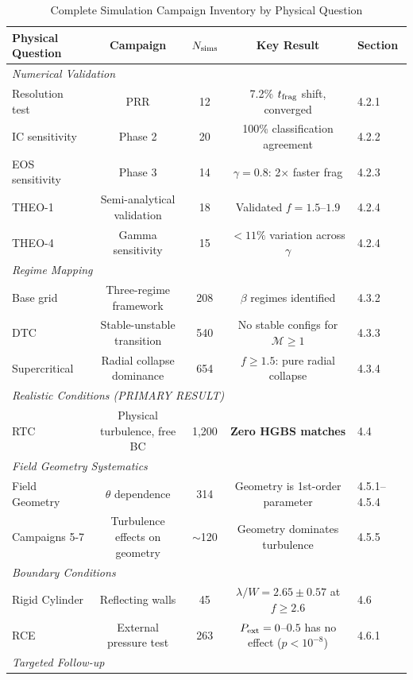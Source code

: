\documentclass[twocolumn,usenatbib]{mnras}
\begin{document}
\begin{table}
\caption{Complete Simulation Campaign Inventory by Physical Question}
\label{tab:campaign_master}
\small
\begin{tabular}{lcccl}
\toprule
\textbf{Physical Question} & \textbf{Campaign} & $N_{\rm sims}$ & \textbf{Key Result} & \textbf{Section} \\
\midrule
\multicolumn{5}{l}{\textit{Numerical Validation}} \\
Resolution test & PRR & 12 & 7.2\% $t_{\rm frag}$ shift, converged & 4.2.1 \\
IC sensitivity & Phase 2 & 20 & 100\% classification agreement & 4.2.2 \\
EOS sensitivity & Phase 3 & 14 & $\gamma=0.8$: 2$\times$ faster frag & 4.2.3 \\
THEO-1 & Semi-analytical validation & 18 & Validated $f=1.5$--$1.9$ & 4.2.4 \\
THEO-4 & Gamma sensitivity & 15 & $<11\%$ variation across $\gamma$ & 4.2.4 \\
\midrule
\multicolumn{5}{l}{\textit{Regime Mapping}} \\
Base grid & Three-regime framework & 208 & $\beta$ regimes identified & 4.3.2 \\
DTC & Stable-unstable transition & 540 & No stable configs for $\mathcal{M}\geq1$ & 4.3.3 \\
Supercritical & Radial collapse dominance & 654 & $f\geq1.5$: pure radial collapse & 4.3.4 \\
\midrule
\multicolumn{5}{l}{\textit{Realistic Conditions (PRIMARY RESULT)}} \\
RTC & Physical turbulence, free BC & 1,200 & \textbf{Zero HGBS matches} & 4.4 \\
\midrule
\multicolumn{5}{l}{\textit{Field Geometry Systematics}} \\
Field Geometry & $\theta$ dependence & 314 & Geometry is 1st-order parameter & 4.5.1--4.5.4 \\
Campaigns 5-7 & Turbulence effects on geometry & $\sim$120 & Geometry dominates turbulence & 4.5.5 \\
\midrule
\multicolumn{5}{l}{\textit{Boundary Conditions}} \\
Rigid Cylinder & Reflecting walls & 45 & $\lambda/W=2.65\pm0.57$ at $f\geq2.6$ & 4.6 \\
RCE & External pressure test & 263 & $P_{\rm ext}=0$--$0.5$ has no effect ($p<10^{-8}$) & 4.6.1 \\
\midrule
\multicolumn{5}{l}{\textit{Targeted Follow-up}} \\

\end{tabular}
\end{table}
\end{document}
